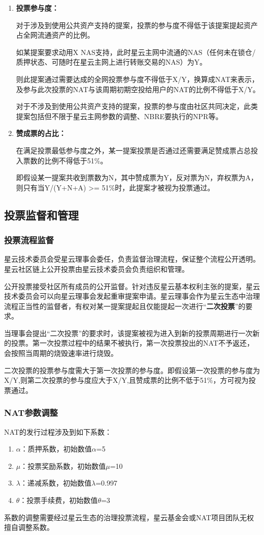 \begin{enumerate}
	\item 

	\textbf{投票参与度：}

	对于涉及到使用公共资产支持的提案，投票的参与度不得低于该提案提起资产占全网流通资产的比例。

	如某提案要求动用X NAS支持，此时星云主网中流通的NAS（任何未在锁仓/质押状态、可随时在星云主网上进行转账交易的NAS）为Y。

	则此提案通过需要达成的全网投票参与度不得低于X/Y，换算成NAT来表示，及参与此次投票的NAT与该周期初期空投给用户的NAT的比例不得低于X/Y。

	对于不涉及到使用公共资产支持的提案，投票的参与度由社区共同决定，此类提案包括但不限于星云主网参数的调整、NBRE要执行的NPR等。

	\item

	\textbf{赞成票的占比：}

	在满足投票最低参与度之外，某一提案投票是否通过还需要满足赞成票占总投入票数的比例不得低于51\%。

	即假设某一提案共收到票数为N，其中赞成票为Y，反对票为N，弃权票为A，则只有当Y/(Y+N+A) >= 51\%时，此提案才被视为投票通过。
\end{enumerate}

\subsection{投票监督和管理}

\subsubsection{投票流程监督}
\label{second-vote}

星云技术委员会受星云理事会委任，负责监督治理流程，保证整个流程公开透明。星云社区链上公开投票由星云技术委员会负责组织和管理。

公开投票接受社区所有成员的公开监督。针对违反星云基本权利主张的提案，星云技术委员会可以向星云理事会发起重审提案申请。星云理事会作为星云生态中治理流程正当性的监督者，有权对某一提案提起且仅能提起一次进行“\textbf{二次投票}”的要求。

当理事会提出“二次投票”的要求时，该提案被视为进入到新的投票周期进行一次新的投票。第一次投票过程中的结果不被执行，第一次投票投出的NAT不予返还，会按照当周期的烧毁速率进行烧毁。

二次投票的投票参与度需大于第一次投票的参与度。即假设第一次投票的参与度为X/Y,则第二次投票的参与度应大于X/Y,且赞成票的比例不低于51\%，方可视为投票通过。

\subsubsection{NAT参数调整}

NAT的发行过程涉及到如下系数：

\begin{enumerate}
	\item $\alpha$：质押系数，初始数值$\alpha$=5
	\item $\mu$：投票奖励系数，初始数值$\mu$=10
	\item $\lambda$：递减系数，初始数值$\lambda$=0.997
	\item $\theta$：投票手续费，初始数值$\theta$=3
\end{enumerate}

系数的调整需要经过星云生态的治理投票流程，星云基金会或NAT项目团队无权擅自调整系数。




